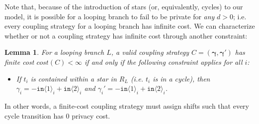 \documentclass[12pt]{article}
\newcommand{\brangle}[1]{\langle #1 \rangle}
\newtheorem{lemma}[thm]{Lemma}
\theoremstyle{definition}
\begin{document}
Note that, because of the introduction of stars (or, equivalently, cycles) to our model, it is possible for a looping branch to fail to be private for \textit{any} $d>0$; i.e. every coupling strategy for a looping branch has infinite cost. We can characterize whether or not a coupling strategy has infinite cost through another constraint:

\begin{lemma}\label{finiteCostConstraintLemma}
    For a looping branch $L$, a valid coupling strategy $C = (\mathbf{\gamma}, \mathbf{\gamma}')$ has finite cost $cost(C)<\infty$ if and only if the following constraint applies for all $i$:
    \begin{itemize}
        \item If $t_i$ is contained within a star in $R_L$ (i.e. $t_i$ is in a cycle), then $\gamma_i = -\texttt{in}\brangle{1}_i+\texttt{in}\brangle{2}_i$ and $\gamma_i' = -\texttt{in}\brangle{1}_i+\texttt{in}\brangle{2}_i$.
    \end{itemize}
\end{lemma}


In other words, a finite-cost coupling strategy must assign shifts such that every cycle transition has 0 privacy cost. 
\end{document}
